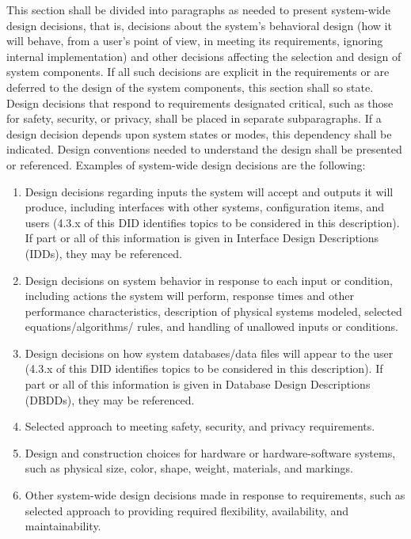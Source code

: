 This section shall be divided into paragraphs as needed to present
system-wide design decisions, that is, decisions about the system's
behavioral design (how it will behave, from a user's point of view, in
meeting its requirements, ignoring internal implementation) and other
decisions affecting the selection and design of system components. If
all such decisions are explicit in the requirements or are deferred to
the design of the system components, this section shall so state. Design
decisions that respond to requirements designated critical, such as
those for safety, security, or privacy, shall be placed in separate
subparagraphs. If a design decision depends upon system states or modes,
this dependency shall be indicated. Design conventions needed to
understand the design shall be presented or referenced. Examples of
system-wide design decisions are the following:

\begin{enumerate}
\itemsep1pt\parskip0pt
\item
  Design decisions regarding inputs the system will accept and outputs
  it will produce, including interfaces with other systems,
  configuration items, and users (4.3.x of this DID identifies topics to
  be considered in this description). If part or all of this information
  is given in Interface Design Descriptions (IDDs), they may be
  referenced.
\item
  Design decisions on system behavior in response to each input or
  condition, including actions the system will perform, response times
  and other performance characteristics, description of physical systems
  modeled, selected equations/algorithms/ rules, and handling of
  unallowed inputs or conditions.
\item
  Design decisions on how system databases/data files will appear to the
  user (4.3.x of this DID identifies topics to be considered in this
  description). If part or all of this information is given in Database
  Design Descriptions (DBDDs), they may be referenced.
\item
  Selected approach to meeting safety, security, and privacy
  requirements.
\item
  Design and construction choices for hardware or hardware-software
  systems, such as physical size, color, shape, weight, materials, and
  markings.
\item
  Other system-wide design decisions made in response to requirements,
  such as selected approach to providing required flexibility,
  availability, and maintainability.
\end{enumerate}

